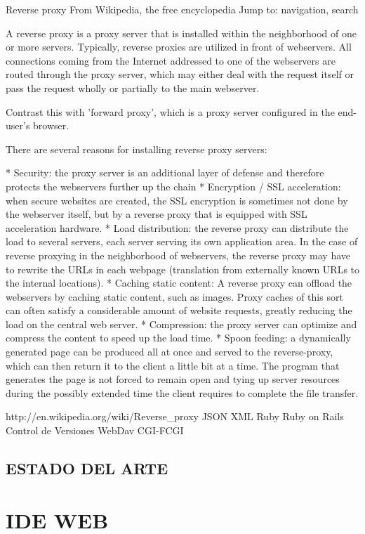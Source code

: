 \documentclass[12pt,letterpaper,oneside]{article}
\begin{document}
Reverse proxy
From Wikipedia, the free encyclopedia
Jump to: navigation, search

A reverse proxy is a proxy server that is installed within the neighborhood of one or more servers. Typically, reverse proxies are utilized in front of webservers. All connections coming from the Internet addressed to one of the webservers are routed through the proxy server, which may either deal with the request itself or pass the request wholly or partially to the main webserver.

Contrast this with 'forward proxy', which is a proxy server configured in the end-user's browser.

There are several reasons for installing reverse proxy servers:

    * Security: the proxy server is an additional layer of defense and therefore protects the webservers further up the chain
    * Encryption / SSL acceleration: when secure websites are created, the SSL encryption is sometimes not done by the webserver itself, but by a reverse proxy that is equipped with SSL acceleration hardware.
    * Load distribution: the reverse proxy can distribute the load to several servers, each server serving its own application area. In the case of reverse proxying in the neighborhood of webservers, the reverse proxy may have to rewrite the URLs in each webpage (translation from externally known URLs to the internal locations).
    * Caching static content: A reverse proxy can offload the webservers by caching static content, such as images. Proxy caches of this sort can often satisfy a considerable amount of website requests, greatly reducing the load on the central web server.
    * Compression: the proxy server can optimize and compress the content to speed up the load time.
    * Spoon feeding: a dynamically generated page can be produced all at once and served to the reverse-proxy, which can then return it to the client a little bit at a time. The program that generates the page is not forced to remain open and tying up server resources during the possibly extended time the client requires to complete the file transfer.



http://en.wikipedia.org/wiki/Reverse_proxy
JSON
XML
Ruby
Ruby on Rails
Control de Versiones
WebDav
CGI-FCGI
\subsection{ESTADO DEL ARTE}

\section{IDE WEB}
\end{document}

